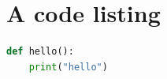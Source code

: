 \section{A code listing}

\begin{lstlisting}[language=Python, caption={Hello example}, label=lst:hello]
def hello():
    print("hello")
\end{lstlisting}
